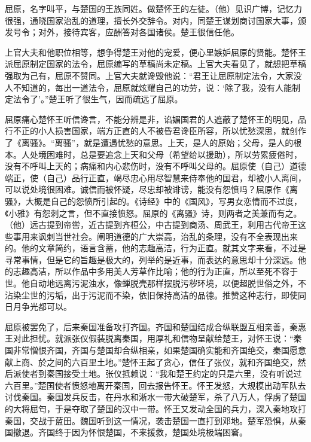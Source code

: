 \documentclass[12pt,UTF-8,openany,a4]{ctexbook}
\begin{document}
\begin{large}
    \yiwen 
    屈原，名字叫平，与楚国的王族同姓。做楚怀王的左徒。（他）见识广博，记忆力很强，通晓国家治乱的道理，擅长外交辞令。对内，同楚王谋划商讨国家大事，颁发号令；对外，接待宾客，应酬答对各国诸侯。楚王很信任他。
    
    上官大夫和他职位相等，想争得楚王对他的宠爱，便心里嫉妒屈原的贤能。楚怀王派屈原制定国家的法令，屈原编写的草稿尚未定稿。上官大夫看见了，就想把草稿强取为己有，屈原不赞同。上官大夫就谗毁他说：“君王让屈原制定法令，大家没人不知道的，每出一道法令，屈原就炫耀自己的功劳，说：‘除了我，没有人能制定法令了’。”楚王听了很生气，因而疏远了屈原。
    
    屈原痛心楚怀王听信谗言，不能分辨是非，谄媚国君的人遮蔽了楚怀王的明见，品行不正的小人损害国家，端方正直的人不被昏君谗臣所容，所以忧愁深思，就创作了《离骚》。“离骚”，就是遭遇忧愁的意思。上天，是人的原始；父母，是人的根本。人处境困难时，总是要追念上天和父母（希望给以援助），所以劳累疲倦时，没有不呼叫上天的；病痛和内心悲伤时，没有不呼叫父母的。屈原使（自己）道德端正，使（自己）品行正直，竭尽忠心用尽智慧来侍奉他的国君，却被小人离间，可以说处境很困难。诚信而被怀疑，尽忠却被诽谤，能没有怨愤吗？屈原作《离骚》，大概是自己的怨愤所引起的。《诗经》中的《国风》，写男女恋情而不过度，《小雅》有怨刺之言，但不直接愤怒。屈原的《离骚》诗，则两者之美兼而有之。（他）远古提到帝喾，近古提到齐桓公，中古提到商汤、周武王，利用古代帝王这些事用来讽刺当世社会。阐明道德的广大崇高，治乱的条理，没有不全表现出来的。他的文章简约，语言含蓄，他的志趣高洁，行为正直。就其文字来看，不过是寻常事情，但是它的旨趣是极大的，列举的是近事，而表达的意思却十分深远。他的志趣高洁，所以作品中多用美人芳草作比喻；他的行为正直，所以至死不容于世。他自动地远离污泥浊水，像蝉脱壳那样摆脱污秽环境，以便超脱世俗之外，不沾染尘世的污垢，出于污泥而不染，依旧保持高洁的品德。推赞这种志行，即使同日月争光都可以。
    
    屈原被罢免了，后来秦国准备攻打齐国。齐国和楚国结成合纵联盟互相亲善，秦惠王对此担忧。就派张仪假装脱离秦国，用厚礼和信物呈献给楚王，对怀王说：“秦国非常憎恨齐国，齐国与楚国却合纵相亲，如果楚国确实能和齐国绝交，秦国愿意献上商、於之间的六百里土地。”楚怀王起了贪心，信任了张仪，就和齐国绝交，然后派使者到秦国接受土地。张仪抵赖说：“我和楚王约定的只是六里，没有听说过六百里。”楚国使者愤怒地离开秦国，回去报告怀王。怀王发怒，大规模出动军队去讨伐秦国。秦国发兵反击，在丹水和淅水一带大破楚军，杀了八万人，俘虏了楚国的大将屈匄，于是夺取了楚国的汉中一带。怀王又发动全国的兵力，深入秦地攻打秦国，交战于蓝田。魏国听到这一情况，袭击楚国一直打到邓地。楚军恐惧，从秦国撤退。齐国终于因为怀恨楚国，不来援救，楚国处境极端困窘。
    

\end{large}
\end{document}
